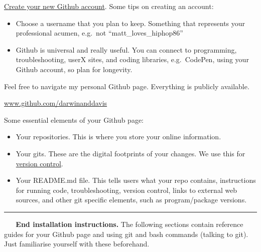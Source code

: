 \documentclass[10,portrait]{article}
\providecommand{\tightlist}{%
  \setlength{\itemsep}{0pt}\setlength{\parskip}{0pt}}
\begin{document}
\href{https://github.com/}{Create your new Github account}. Some tips on
creating an account:

\begin{itemize}
\tightlist
\item
  Choose a username that you plan to keep. Something that represents
  your professional acumen, e.g.~not ``matt\_loves\_hiphop86''\\
  \hspace*{0.333em}
\item
  Github is universal and really useful. You can connect to programming,
  troubleshooting, userX sites, and coding libraries, e.g.~CodePen,
  using your Github account, so plan for longevity.\\
  \hspace*{0.333em}
\end{itemize}

Feel free to navigate my personal Github page. Everything is publicly
available.

\url{www.github.com/darwinanddavis}

Some essential elements of your Github page:

\begin{itemize}
\tightlist
\item
  Your repositories. This is where you store your online information.\\
  \hspace*{0.333em}
\item
  Your gits. These are the digital footprints of your changes. We use
  this for
  \href{https://git-scm.com/book/en/v2/Getting-Started-About-Version-Control}{version
  control}.\\
  \hspace*{0.333em}
\item
  Your README.md file. This tells users what your repo contains,
  instructions for running code, troubleshooting, version control, links
  to external web sources, and other git specific elements, such as
  program/package versions.\\
  \hspace*{0.333em}
\end{itemize}

\begin{center}\rule{0.5\linewidth}{\linethickness}\end{center}

~ ~ \textbf{End installation instructions.} The following sections
contain reference guides for your Github page and using git and bash
commands (talking to git). Just familiarise yourself with these
beforehand.
\end{document}
